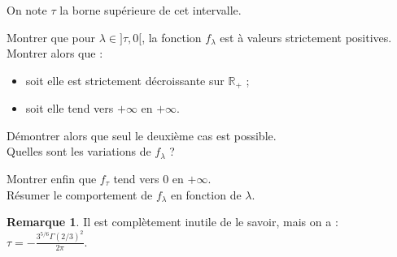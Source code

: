 \documentclass[french]{article}
\newcommand{\R}{\mathbb{R}}
\theoremstyle{plain}
\theoremstyle{definition}
\newtheorem*{rmq}{Remarque}
\theoremstyle{remark}
\begin{document}
On note $\tau$ la borne supérieure de cet intervalle.

\begin{exo}
	Montrer que pour $\lambda\in]\tau,0[$, la fonction $f_\lambda$ est à valeurs strictement positives. Montrer alors que :
	\begin{itemize}
		\item soit elle est strictement décroissante sur $\R_+$ ;
		\item soit elle tend vers $+\infty$ en $+\infty$.
	\end{itemize}
	Démontrer alors que seul le deuxième cas est possible.\\
	Quelles sont les variations de $f_\lambda$ ?
\end{exo}

\begin{exo}
	Montrer enfin que $f_\tau$ tend vers $0$ en $+\infty$. \\
	Résumer le comportement de $f_\lambda$ en fonction de $\lambda$.
\end{exo}

\begin{rmq}
	Il est complètement inutile de le savoir, mais on a : $\tau=\displaystyle -\frac{3^{5/6}\Gamma(2/3)^2}{2\pi}$.
\end{rmq}
\end{document}
